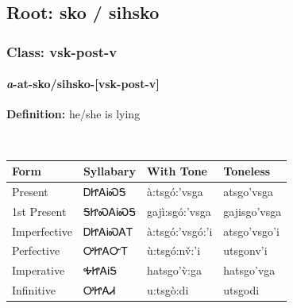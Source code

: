 \needspace{4in}
\subsection*{Root: sko / sihsko}
\nopagebreak
{}
\needspace{3in}
\subsubsection*{Class: vsk-post-v}
\nopagebreak
\needspace{2in}
\paragraph*{\textit{a}{-}at{-}\textbf{sko/sihsko}{-}[vsk-post-v]}
\nopagebreak
\textbf{Definition: } he/she is lying
\\[0.5em]
\begin{tabularx}{\textwidth}{l X X X}%
\toprule%
\textbf{Form}&\textbf{Syllabary}&\textbf{With Tone}&\textbf{Toneless}\\%
\midrule%
Present&ᎠᏥᎪᎥᏍᎦ&à:tsgó:’vsga&atsgo’vsga\\%
1st Present&ᎦᏥᏍᎪᎥᏍᎦ&gajì:sgó:’vsga&gajisgo’vsga\\%
Imperfective&ᎠᏥᎪᎥᏍᎪᎢ&à:tsgó:’vsgó:’i&atsgo’vsgo’i\\%
Perfective&ᎤᏥᎪᏅᎢ&ù:tsgó:nv̌:’i&utsgonv’i\\%
Imperative&ᎭᏥᎪᎥᎦ&hatsgo’v̀:ga&hatsgo’vga\\%
Infinitive&ᎤᏥᎪᏗ&u:tsgò:di&utsgodi\\%
\bottomrule%
\end{tabularx}
\\[1em]